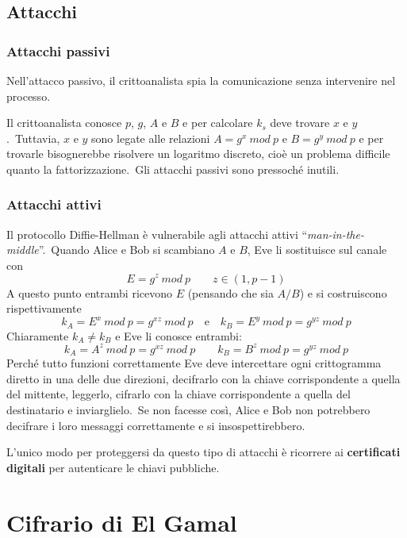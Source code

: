 \subsection{Attacchi}

\subsubsection{Attacchi passivi}

Nell'attacco passivo, il crittoanalista spia la comunicazione senza intervenire nel processo.\

Il crittoanalista conosce $p$, $g$, $A$ e $B$ e per calcolare $k_s$ deve trovare $x$ e $y$.\
Tuttavia, $x$ e $y$ sono legate alle relazioni $A = g^x\ \mathit{mod}\ p$ e $B = g^y\ \mathit{mod}\ p$ e per trovarle bisognerebbe risolvere un logaritmo discreto, cioè un problema difficile quanto la fattorizzazione.\
Gli attacchi passivi sono pressoché inutili.

\subsubsection{Attacchi attivi}

Il protocollo Diffie-Hellman è vulnerabile agli attacchi attivi ``\textit{man-in-the-middle}''.\
Quando Alice e Bob si scambiano $A$ e $B$, Eve li sostituisce sul canale con
\[E = g^z\ \mathit{mod}\ p\qquad z \in (1,p-1)\]
A questo punto entrambi ricevono $E$ (pensando che sia $A/B$) e si costruiscono rispettivamente
\[k_A = E^x\ \mathit{mod}\ p = g^{xz}\ \mathit{mod}\ p\quad \mathrm{e}\quad k_B = E^y\ \mathit{mod}\ p = g^{yz}\ \mathit{mod}\ p\]
Chiaramente $k_A \neq k_B$ e Eve li conosce entrambi:
\[k_A = A^z\ \mathit{mod}\ p = g^{xz}\ \mathit{mod}\ p \qquad k_B = B^z\ \mathit{mod}\ p = g^{yz}\ \mathit{mod}\ p\]
Perché tutto funzioni correttamente Eve deve intercettare ogni crittogramma diretto in una delle due direzioni, decifrarlo con la chiave corrispondente a quella del mittente, leggerlo, cifrarlo con la chiave corrispondente a quella del destinatario e inviarglielo.\
Se non facesse così, Alice e Bob non potrebbero decifrare i loro messaggi correttamente e si insospettirebbero.\

L'unico modo per proteggersi da questo tipo di attacchi è ricorrere ai \textbf{certificati digitali} per autenticare le chiavi pubbliche.\

\section{Cifrario di El Gamal}

